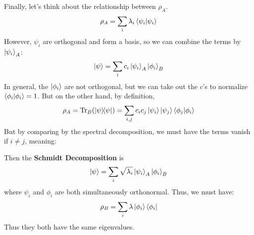 Finally, let's think about the relationship between $\rho_A$.
\[ \rho_A = \sum_i \lambda_i \braket{\psi_i}{\psi_i} \]
However, $\psi_i$ are orthogonal and form a basis, so we can combine the terms by $\ket{\psi_i}_A$:
\[ \ket{\psi} = \sum_i c_i \ket{\psi_i}_{A} \ket{\phi_i}_B \]
In general, the $\ket{\phi_i}$ are not orthogonal, but we can take out the $c$'s to normalize $\braket{\phi_i}{\phi_i} = 1$.
But on the other hand, by definition,
\[ \rho_A = \Tr_B(\ketbra{\psi}{\psi}) = \sum_{i, j}  c_i c_j \ket{\psi_i}\ket{\psi_j} \braket{\phi_j}{\phi_i} \]
But by comparing by the spectral decomposition, we must have the terms vanish if $i \neq j$, meaning:

Then the \textbf{Schmidt Decomposition} is
\[ \ket{\psi} = \sum_i \sqrt{\lambda_i} \ket{\psi_i}_A \ket{\phi_i}_B \]
where $\psi_i$ and $\phi_i$ are both simultaneously orthonormal. Thus, we must have:
\[ \rho_B = \sum_i \lambda \ket{\phi_i}\bra{\phi_i} \]
Thus they both have the same eigenvalues.
